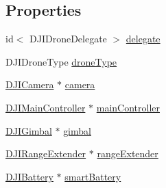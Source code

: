 \subsection*{Properties}
\begin{DoxyCompactItemize}
\item 
id$<$ D\+J\+I\+Drone\+Delegate $>$ \hyperlink{interface_d_j_i_drone_a348f8faf9da7670e19289130c4490c9a}{delegate}
\item 
D\+J\+I\+Drone\+Type \hyperlink{interface_d_j_i_drone_a5f830dba99822f494acfd499308d3818}{drone\+Type}
\item 
\hyperlink{interface_d_j_i_camera}{D\+J\+I\+Camera} $\ast$ \hyperlink{interface_d_j_i_drone_adf9479847eb1e9826dcadfeeab3b12d0}{camera}
\item 
\hyperlink{interface_d_j_i_main_controller}{D\+J\+I\+Main\+Controller} $\ast$ \hyperlink{interface_d_j_i_drone_a7f05dfcf7d06e7663926954211683eb4}{main\+Controller}
\item 
\hyperlink{interface_d_j_i_gimbal}{D\+J\+I\+Gimbal} $\ast$ \hyperlink{interface_d_j_i_drone_a4e03ec9b32a2ab6a9755ff9c065cca76}{gimbal}
\item 
\hyperlink{interface_d_j_i_range_extender}{D\+J\+I\+Range\+Extender} $\ast$ \hyperlink{interface_d_j_i_drone_aad1a0914357ef128bb16d52f8a7670e4}{range\+Extender}
\item 
\hyperlink{interface_d_j_i_battery}{D\+J\+I\+Battery} $\ast$ \hyperlink{interface_d_j_i_drone_a762451fe8b64cbbc3c9d288ef29b0f99}{smart\+Battery}
\end{DoxyCompactItemize}


